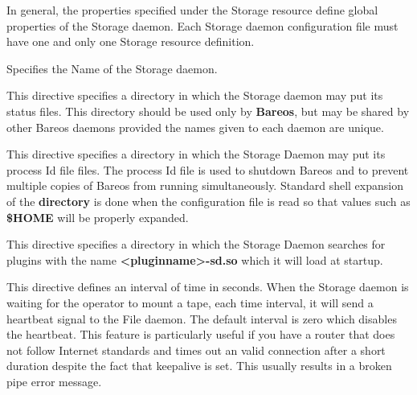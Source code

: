 In general, the properties specified under the Storage resource define global
properties of the Storage daemon. Each Storage daemon configuration file must
have one and only one Storage resource definition.

\begin{description}

Specifies the Name of the Storage daemon.

This directive specifies a directory in which the Storage daemon may put
its status files. This directory should be used only  by {\bf Bareos},
but may be shared by other Bareos daemons provided the names given to each
daemon are unique.

This directive specifies a directory in which the Storage Daemon may put its
process Id file files. The process Id file is used to  shutdown Bareos and to
prevent multiple copies of  Bareos from running simultaneously.
Standard shell expansion of the {\bf directory} is done when the
configuration file is read so that values such  as {\bf \$HOME} will be
properly expanded.


This directive specifies a directory in which the Storage Daemon searches for
plugins with the name {\bf {\textless}pluginname{\textgreater}-sd.so} which it will load at startup.


This directive defines an interval of time in seconds.  When
the Storage daemon is waiting for the operator to mount a
tape, each time interval, it will send a heartbeat signal to
the File daemon.  The default interval is zero which disables
the heartbeat.  This feature is particularly useful if you
have a router that does not follow Internet
standards and times out an valid connection after a short
duration despite the fact that keepalive is set.  This usually
results in a broken pipe error message.


\end{description}
